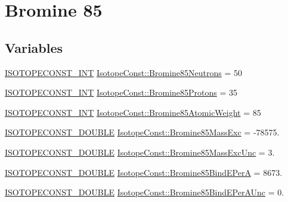 \hypertarget{group___isotope_const-_bromine-_br85}{}\section{Bromine 85}
\label{group___isotope_const-_bromine-_br85}
\subsection*{Variables}
\begin{DoxyCompactItemize}
\item 
\mbox{\hyperlink{group___isotope_const-_macros_ga5f18360b3e99483a35c32d789e62621c}{I\+S\+O\+T\+O\+P\+E\+C\+O\+N\+S\+T\+\_\+\+I\+NT}} \mbox{\hyperlink{group___isotope_const-_bromine-_br85_gac13fc469cffe3ae52f69cb1b81588433}{Isotope\+Const\+::\+Bromine85\+Neutrons}} = 50
\item 
\mbox{\hyperlink{group___isotope_const-_macros_ga5f18360b3e99483a35c32d789e62621c}{I\+S\+O\+T\+O\+P\+E\+C\+O\+N\+S\+T\+\_\+\+I\+NT}} \mbox{\hyperlink{group___isotope_const-_bromine-_br85_ga0c1d316204e2f77f8a5618fc6dca69e7}{Isotope\+Const\+::\+Bromine85\+Protons}} = 35
\item 
\mbox{\hyperlink{group___isotope_const-_macros_ga5f18360b3e99483a35c32d789e62621c}{I\+S\+O\+T\+O\+P\+E\+C\+O\+N\+S\+T\+\_\+\+I\+NT}} \mbox{\hyperlink{group___isotope_const-_bromine-_br85_gad82633eb72aa6e3c50b2471961e1e658}{Isotope\+Const\+::\+Bromine85\+Atomic\+Weight}} = 85
\item 
\mbox{\hyperlink{group___isotope_const-_macros_ga8f45a7272ce02c0b4c65c44636ed719a}{I\+S\+O\+T\+O\+P\+E\+C\+O\+N\+S\+T\+\_\+\+D\+O\+U\+B\+LE}} \mbox{\hyperlink{group___isotope_const-_bromine-_br85_ga777187a8222623fea7b866a7cd621fbd}{Isotope\+Const\+::\+Bromine85\+Mass\+Exc}} = -\/78575.
\item 
\mbox{\hyperlink{group___isotope_const-_macros_ga8f45a7272ce02c0b4c65c44636ed719a}{I\+S\+O\+T\+O\+P\+E\+C\+O\+N\+S\+T\+\_\+\+D\+O\+U\+B\+LE}} \mbox{\hyperlink{group___isotope_const-_bromine-_br85_ga2b255ac118184ff92d8fa53b2350c1c7}{Isotope\+Const\+::\+Bromine85\+Mass\+Exc\+Unc}} = 3.
\item 
\mbox{\hyperlink{group___isotope_const-_macros_ga8f45a7272ce02c0b4c65c44636ed719a}{I\+S\+O\+T\+O\+P\+E\+C\+O\+N\+S\+T\+\_\+\+D\+O\+U\+B\+LE}} \mbox{\hyperlink{group___isotope_const-_bromine-_br85_gaf4c6b8af1a046fde5432cba6e7e84a5d}{Isotope\+Const\+::\+Bromine85\+Bind\+E\+PerA}} = 8673.
\item 
\mbox{\hyperlink{group___isotope_const-_macros_ga8f45a7272ce02c0b4c65c44636ed719a}{I\+S\+O\+T\+O\+P\+E\+C\+O\+N\+S\+T\+\_\+\+D\+O\+U\+B\+LE}} \mbox{\hyperlink{group___isotope_const-_bromine-_br85_ga05bce81583d59f0a023d331b0728d411}{Isotope\+Const\+::\+Bromine85\+Bind\+E\+Per\+A\+Unc}} = 0.

\end{DoxyCompactItemize}
